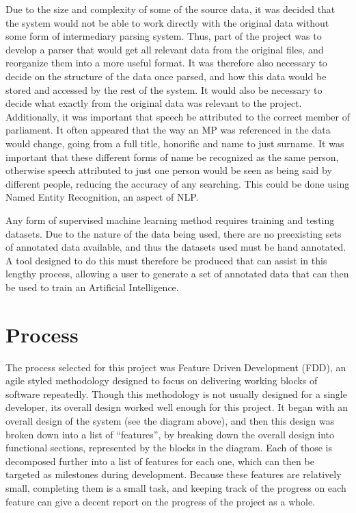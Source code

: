 Due to the size and complexity of some of the source data, it was decided that the system would not be able to work directly with the original data without some form of intermediary parsing system. Thus, part of the project was to develop a parser that would get all relevant data from the original files, and reorganize them into a more useful format. It was therefore also necessary to decide on the structure of the data once parsed, and how this data would be stored and accessed by the rest of the system. It would also be necessary to decide what exactly from the original data was relevant to the project.
Additionally, it was important that speech be attributed to the correct member of parliament. It often appeared that the way an MP was referenced in the data would change, going from a full title, honorific and name to just surname. It was important that these different forms of name be recognized as the same person, otherwise speech attributed to just one person would be seen as being said by different people, reducing the accuracy of any searching. This could be done using Named Entity Recognition, an aspect of NLP.

Any form of supervised machine learning method requires training and testing datasets. Due to the nature of the data being used, there are no preexisting sets of annotated data available, and thus the datasets used must be hand annotated. A tool designed to do this must therefore be produced that can assist in this lengthy process, allowing a user to generate a set of annotated data that can then be used to train an Artificial Intelligence.

\section{Process}
\label{sec:bck_process}
The process selected for this project was Feature Driven Development (FDD), an agile styled methodology designed to focus on delivering working blocks of software repeatedly. Though this methodology is not usually designed for a single developer, its overall design worked well enough for this project. It began with an overall design of the system (see the diagram above), and then this design was broken down into a list of “features”, by breaking down the overall design into functional sections, represented by the blocks in the diagram. Each of those is decomposed further into a list of features for each one, which can then be targeted as milestones during development. Because these features are relatively  small, completing them is a small task, and keeping track of the progress on each feature can give a decent report on the progress of the project as a whole.

